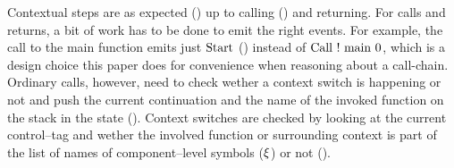 \documentclass[acmsmall,review,screen,dvipsnames]{acmart}
\begin{document}
\begin{center}
\end{center}

Contextual steps are as expected () up to calling () and returning.
For calls and returns, a bit of work has to be done to emit the right events.
For example, the call to the main function emits just $\text{Start}$ () instead of $\text{Call}\  ! \ \text{main}\ 0$, which is a design choice this paper does for convenience when reasoning about a call-chain.
Ordinary calls, however, need to check wether a context switch is happening or not and push the current continuation and the name of the invoked function on the stack in the state ().
Context switches are checked by looking at the current control--tag and wether the involved function or surrounding context is part of the list of names of component--level symbols ($\xi$) or not ().
\end{document}

